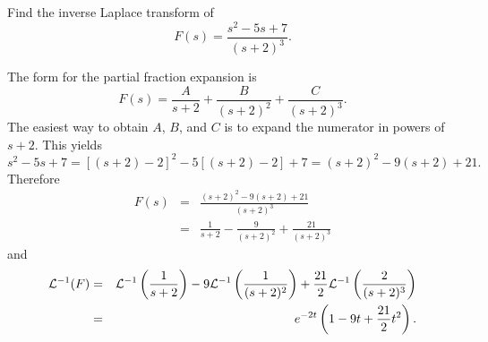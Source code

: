 \documentclass{ximera}
\begin{document}
\begin{example}\label{example:8.2.7} Find the inverse Laplace transform
of
$$
F(s)=\frac{s^2-5s+7}{(s+2)^3}.
$$


\begin{explanation}
The form for the partial fraction expansion  is
$$
F(s)=\frac{A}{s+2}+\frac{B}{(s+2)^2}+\frac{C}{(s+2)^3}.
$$
The easiest way to obtain $A$, $B$, and $C$ is to expand the numerator
in powers of $s+2$. This yields
$$
s^2-5s+7=[(s+2)-2]^2-5[(s+2)-2]+7=(s+2)^2-9(s+2)+21.
$$
Therefore
\begin{eqnarray*}
F(s)&=&\frac{(s+2)^2-9(s+2)+21}{(s+2)^3}\\[10pt]
&=&\frac{1}{s+2}-\frac{9}{(s+2)^2}+\frac{21}{(s+2)^3}
\end{eqnarray*}
and
\begin{eqnarray*}
{\cal L}^{-1}(F)&=&
{\cal L}^{-1}\left(\frac{1}{s+2}\right)-9{\cal
L}^{-1}\left(\frac{1}{(s+2)^2}\right)+\frac{21}{2}{\cal
L}^{-1}\left(\frac{2}{(s+2)^3}\right)\\&=&
e^{-2t}\left(1-9t+\frac{21}{2}t^2\right).
\end{eqnarray*}
\end{explanation}
\end{example}
\end{document}
